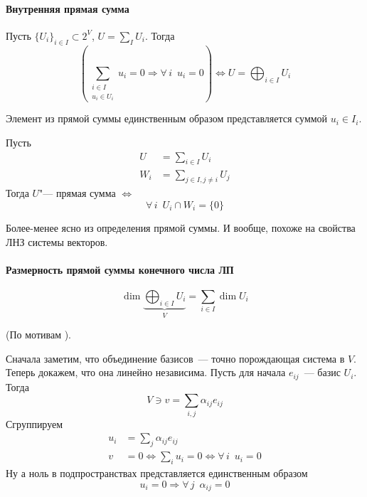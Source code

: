 \documentclass[12pt]{../../notes}
\begin{document}
\paragraph{Внутренняя прямая сумма}
\begin{defn}\label{defn:dirsum}
  Пусть $\{U_i\}_{i\in I} \subset 2^V$, $U = \sum_I U_i$. Тогда
  \[
    \left( \sum_{\substack{i\in I \\ u_i\in U_i}} u_i = 0 
    \Rightarrow \forall\, i \;\: u_i = 0\right)
    \Leftrightarrow U = \bigoplus_{i\in I} U_i
  \]
\end{defn}

\begin{lem}\label{lem:dirsumuniq}
  Элемент из прямой суммы единственным образом представляется суммой $u_i \in I_i$.
\end{lem}

\begin{thrm}\label{thrm:dirsumcrit}
  Пусть  
  \begin{align*}
    U   &= \sum_{i \in I}  U_i \\
    W_i &= \sum_{j\in I, j\neq i} U_j
  \end{align*}
  Тогда $U$"--- прямая сумма $\Leftrightarrow$ 
  \[
    \forall\, i \;\: U_i \cap W_i = \{0\}
  \]
\end{thrm}
\begin{ittproof}
  Более-менее ясно из определения прямой суммы. И вообще, похоже на свойства ЛНЗ системы
  векторов. 
\end{ittproof}

\paragraph{Размерность прямой суммы конечного числа ЛП}
\begin{thrm}\label{thrm:dimdirsum}
  \[
    \dim \underbrace{\bigoplus_{i\in I} U_i}_{V} = \sum_{i\in I} \dim U_i
  \]
\end{thrm}
\begin{ittproof}
(По мотивам \cite[стр.~195]{vinberg}).

  Сначала заметим, что объединение базисов~--- точно порождающая система в $V$.
  Теперь докажем, что она линейно независима.
  Пусть для начала ${e_{ij}}$~--- базис $U_i$.
  Тогда 
  \[
    V \ni v = \sum_{i,j} \alpha_{ij} e_{ij} 
  \]
  Сгруппируем
  \begin{align*}
    u_i &= \sum_j \alpha_{ij} e_{ij} \\
      v &= 0 \Leftrightarrow \sum_i u_i = 0 \Leftrightarrow \forall\, i \;\: u_i = 0
  \end{align*}
  Ну а ноль в подпространствах представляется единственным образом
  \[
    u_i = 0 \Rightarrow \forall\, j \;\: \alpha_{ij} = 0
  \]
\end{ittproof} 
\end{document}
